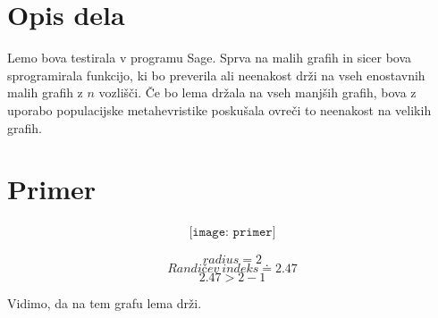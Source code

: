 \documentclass[a4paper, 10pt]{article}
\begin{document}
\section{Opis dela}

Lemo bova testirala v programu Sage. Sprva na malih grafih in sicer bova sprogramirala funkcijo, ki bo preverila ali neenakost drži na vseh enostavnih malih grafih z $n$ vozlišči. Če bo lema držala na vseh manjših grafih, bova z uporabo populacijske metahevristike poskušala ovreči to neenakost na velikih grafih.

\section{Primer}

\begin{align*}
\texttt{[image: primer]}
\end{align*}

$$radius = 2$$
$$Randičev \ indeks \doteq 2.47$$
$$2.47 > 2 - 1$$

Vidimo, da na tem grafu lema drži.
\end{document}
